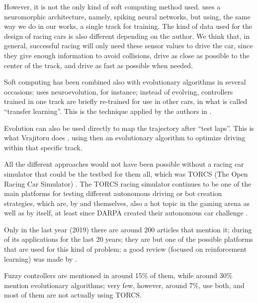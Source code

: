 \documentclass[10pt,journal,compsoc]{IEEEtran}
\begin{document}
However, it is not the only kind of soft computing method
used. \cite{mirus2019short} uses a neuromorphic architecture, namely,
spiking neural networks, but using, the same way we do in our works, a single track for training. The kind of data used for the design of racing cars is
also different depending on the author. We think that, in general, successful racing will only need these sensor values to drive the car, since they give enough information to avoid collisions, drive as close as possible to the
center of the track, and drive as fast as possible when needed.

Soft computing has been combined also with evolutionary algorithms 
in several occasions: \cite{10.1371/journal.pone.0213193} uses
neuroevolution, for instance; instead of evolving, controllers trained
in one track are briefly re-trained for use in other cars, in what is
called ``transfer learning''. This is the technique applied by the authors in 
\cite{verma2018programmatically}. 


Evolution can also be used directly to map the trajectory after ``test
laps''. This is what Vrajitoru does \cite{vrajitoru2019trajectory,vrajitorugenetic}, using then an evolutionary algorithm to optimize driving within that specific track. 



All the different approaches would not have been possible without a
racing car simulator that could be the testbed for them all, which was
TORCS (The Open Racing Car Simulator) \cite{torcs4}. The TORCS racing simulator
continues to be one of the main platforms  
for testing different autonomous driving or bot creation strategies,
which are, by and themselves, also a hot topic in the gaming arena as
well as by itself, at least since DARPA created their autonomous car
challenge \cite{badue2019selfdriving}.


Only in the last year (2019) there are around 200 articles that
mention it; during  \cite{schiavullo2019torcs} of its
applications for the last 20 years; they are but one of the possible
platforms that are used for this kind of problem; a good review
(focused on reinforcement learning) was made by
\cite{abuzekry2comparative}. 

Fuzzy controllers are mentioned in around 15\% of them, while around 30\% mention evolutionary algorithms; very few, however, around 7\%, use both, and most of them are not actually using TORCS.
\end{document}
